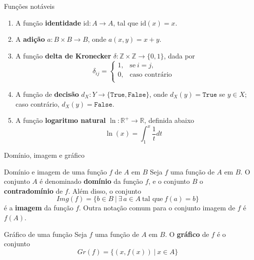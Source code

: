 \begin{frame}[fragile]{Funções notáveis}

    \begin{enumerate}
        \item A função \textbf{identidade} $\mathrm{id}: A\to A$, tal que $\mathrm{id}(x) = x$.

        \item A \textbf{adição} $a: B\times B \to B$, onde $a(x, y) = x + y$.
 
        \item A função \textbf{delta de Kronecker} $\delta: \mathbb{Z}\times \mathbb{Z}\to 
            \lbrace 0, 1\rbrace$, dada por
            \[
                \delta_{ij} = \left\lbrace \begin{array}{ll} 1, & \mbox{se}\ i = j, \\
                                                             0, & \mbox{caso contrário}\\
                                           \end{array} \right.
            \]

        \item A função de \textbf{decisão} $d_X: Y\to \lbrace \mathtt{True, False}\rbrace$, onde
            $d_X(y) = \mathtt{True}$ se $y\in X$; caso contrário, $d_X(y) = \mathtt{False}$.

        \item A função \textbf{logaritmo natural} $\ln: \mathbb{R^+}\to \mathbb{R}$, definida 
        abaixo
        \[
            \ln(x) = \int_1^x \frac{1}{t} dt
        \]

    \end{enumerate}

\end{frame}

\begin{frame}[fragile]{Domínio, imagem e gráfico}

    \begin{block}{Domínio e imagem de uma função $f$ de $A$ em $B$}
        Seja $f$ uma função de $A$ em $B$. O conjunto $A$ é denominado \textbf{domínio} da
            função $f$, e o conjunto $B$ o \textbf{contradomínio} de $f$. Além disso, o conjunto
        \[
            Img(f) = \lbrace b \in B\ |\ \exists\, a\in A\ \mbox{tal que}\ f(a) = b \rbrace
        \]
        é a \textbf{imagem} da função $f$. Outra notação comum para o conjunto imagem de $f$ é 
        $f(A)$.
    \end{block}

    \vspace{0.05in}

    \begin{block}{Gráfico de uma função}
        Seja $f$ uma função de $A$ em $B$. O \textbf{gráfico} de $f$ é o conjunto
        \[
            Gr(f) = \lbrace (x, f(x))\ |\ x\in A\rbrace
        \]
    \end{block}

\end{frame}

